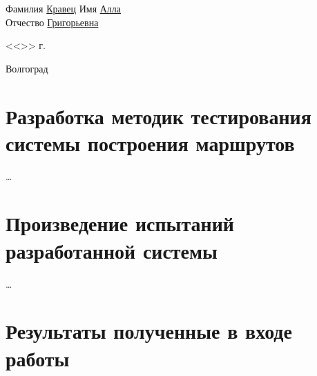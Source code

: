 \documentclass[a4paper, 14pt]{extreport}
\begin{document}
\begin{titlepage}
\begin{flushleft}
            Фамилия \underline{Кравец\hspace{3.3cm}} Имя \underline{Алла\hspace{5.5cm}}\\
            Отчество \underline{Григорьевна\hspace{2.2cm}}
        \end{flushleft}
        \vspace{1.5cm}
        \begin{flushright}
            <<\underline{\hspace{1.0cm}}>>\underline{\hspace{4.0cm}} \the\year г.
        \end{flushright}
        \vspace{\fill}
        \begin{center}
            Волгоград \the\year
        \end{center}
    \end{titlepage}
    \tableofcontents
    \onehalfspacing

    \chapter{Разработка методик тестирования системы построения маршрутов}
    \ldots

    \chapter{Произведение испытаний разработанной системы}
    \ldots

    \chapter{Результаты полученные в входе работы}
\end{document}
